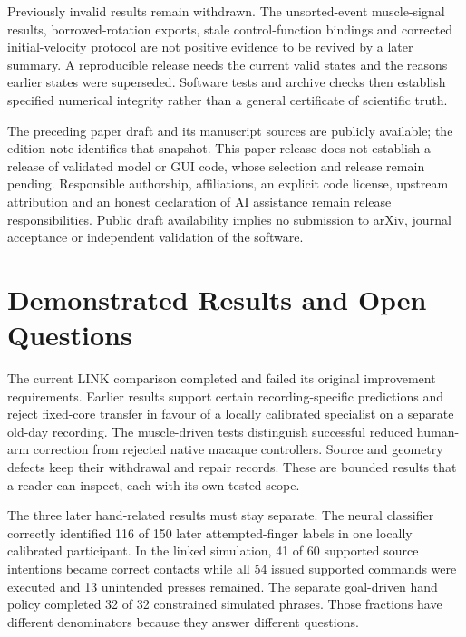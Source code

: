 Previously invalid results remain withdrawn. The unsorted-event muscle-signal results, borrowed-rotation exports, stale control-function bindings and corrected initial-velocity protocol are not positive evidence to be revived by a later summary. A reproducible release needs the current valid states and the reasons earlier states were superseded. Software tests and archive checks then establish specified numerical integrity rather than a general certificate of scientific truth.

The preceding paper draft and its manuscript sources are publicly available; the edition note identifies that snapshot. This paper release does not establish a release of validated model or GUI code, whose selection and release remain pending. Responsible authorship, affiliations, an explicit code license, upstream attribution and an honest declaration of AI assistance remain release responsibilities. Public draft availability implies no submission to arXiv, journal acceptance or independent validation of the software.






\section{Demonstrated Results and Open Questions}

The current LINK comparison completed and failed its original improvement
requirements. Earlier results support certain recording-specific predictions
and reject fixed-core transfer in favour of a locally calibrated specialist
on a separate old-day recording. The muscle-driven tests distinguish successful
reduced human-arm correction from rejected native macaque controllers. Source
and geometry defects keep their withdrawal and repair records. These are
bounded results that a reader can inspect, each with its own tested scope.

The three later hand-related results must stay separate. The neural classifier
correctly identified 116 of 150 later attempted-finger labels in one locally
calibrated participant. In the linked simulation, 41 of 60 supported source
intentions became correct contacts while all 54 issued supported commands were
executed and 13 unintended presses remained. The separate goal-driven hand
policy completed 32 of 32 constrained simulated phrases. Those fractions have
different denominators because they answer different questions.

